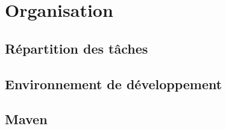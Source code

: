 \section{Organisation}

\subsection{Répartition des tâches}

\subsection{Environnement de développement}

\subsection{Maven}



